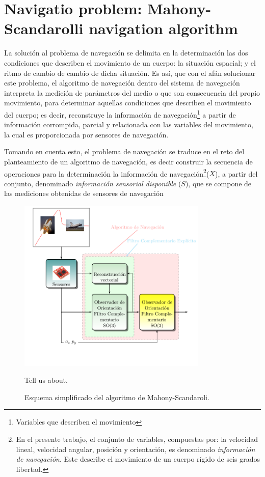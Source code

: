 \documentclass[conference]{IEEEtran}
\begin{document}
\section{Navigatio problem: Mahony-Scandarolli navigation algorithm}\label{nav_problem}
La solución al problema de navegación se delimita en la determinación las dos condiciones que describen el movimiento de un cuerpo: la situación espacial; y el ritmo de cambio de cambio de dicha situación. Es así, que con el afán solucionar este problema, el algoritmo de navegación dentro del sistema de navegación interpreta la medición de parámetros del medio o que son consecuencia del propio movimiento, para determinar aquellas condiciones que describen el movimiento del cuerpo; es decir, reconstruye la información de navegación\footnote{Variables que describen el movimiento} a partir de información corrompida, parcial y relacionada con las variables del movimiento, la cual es proporcionada por sensores de navegación.\par
Tomando en cuenta esto, el problema de navegación se traduce en el reto del planteamiento de un algoritmo de navegación, es decir construir la secuencia de operaciones para la determinación la información de navegación\footnote{En el presente trabajo, el conjunto de variables, compuestas por: la velocidad lineal, velocidad angular, posición y orientación, es denominado \emph{información de navegación}. Este describe el movimiento de un cuerpo rígido de seis grados libertad.}($X$), a partir del conjunto, denominado \emph{información sensorial disponible} ($S$), que se compone de las mediciones obtenidas de sensores de navegación\par
\begin{figure}
\begin{center}
\includegraphics[width=9cm,clip]{intro_fig4.pdf}
\caption{Esquema simplificado del algoritmo de Mahony-Scandaroli.}
\scriptsize{Tell us about.}
\label{solucionMS_fig1}
\end{center}
\end{figure}
\end{document}
